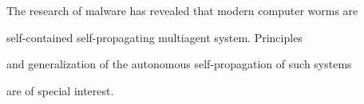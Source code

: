 \noindent


The research of malware has revealed that modern computer worms are 


self-contained self-propagating multiagent system. Principles 


and generalization of the autonomous self-propagation of such systems 


are of special interest.










\vspace*{-5pt}

























\def\leftkol{\ } %


\def\rightkol{\ } %





 





\def\tit{LINUX-BASED OPERATING SYSTEMS VULNERABILITIES SEARCHING~METHODS}





\def\aut{A.\,I.~Mishchenko}





\def\auf{IPI RAN, alximi@gmail.com}        

























